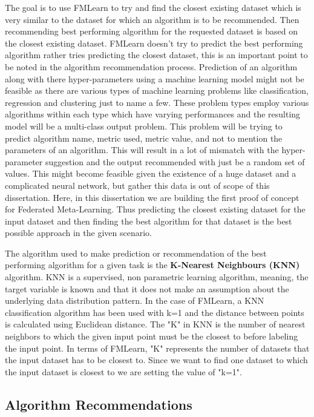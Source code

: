 The goal is to use FMLearn to try and find the closest existing dataset which is very similar to the dataset for which an algorithm is to be recommended. Then recommending best performing algorithm for the requested dataset is based on the closest existing dataset. FMLearn doesn't try to predict the best performing algorithm rather tries predicting the closest dataset, this is an important point to be noted in the algorithm recommendation process. Prediction of an algorithm along with there hyper-parameters using a machine learning model might not be feasible as there are various types of machine learning problems like classification, regression and clustering just to name a few. These problem types employ various algorithms within each type which have varying performances and the resulting model will be a multi-class output problem. This problem will be trying to predict algorithm name, metric used, metric value, and not to mention the parameters of an algorithm. This will result in a lot of mismatch with the hyper-parameter suggestion and the output recommended with just be a random set of values. This might become feasible given the existence of a huge dataset and a complicated neural network, but gather this data is out of scope of this dissertation. Here, in this dissertation we are building the first proof of concept for Federated Meta-Learning. Thus predicting the closest existing dataset for the input dataset and then finding the best algorithm for that dataset is the best possible approach in the given scenario.

The algorithm used to make prediction or recommendation of the best performing algorithm for a given task is the \textbf{K-Nearest Neighbours (KNN)} algorithm. KNN is a supervised, non parametric learning algorithm, meaning, the target variable is known and that it does not make an assumption about the underlying data distribution pattern. In the case of FMLearn, a KNN classification algorithm has been used with k=1 and the distance between points is calculated using Euclidean distance. The "K" in KNN is the number of nearest neighbors to which the given input point must be the closest to before labeling the input point. In terms of FMLearn, "K" represents the number of datasets that the input dataset has to be closest to. Since we want to find one dataset to which the input dataset is closest to we are setting the value of "k=1". 

\subsection*{Algorithm Recommendations}

